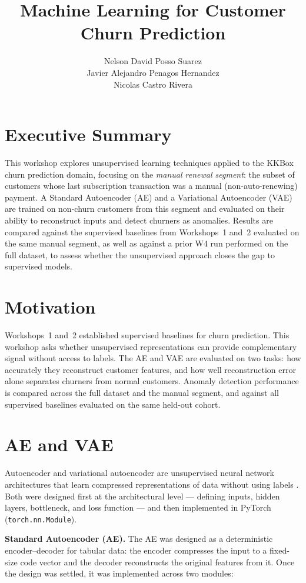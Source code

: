 \documentclass{article}
\title{ Machine Learning for Customer Churn Prediction}
\author{Nelson David Posso Suarez \\ Javier Alejandro Penagos Hernandez \\ Nicolas Castro Rivera }
\date{}
\begin{document}
\maketitle


\section{Executive Summary}
This workshop explores unsupervised learning techniques applied to the KKBox churn
prediction domain, focusing on the \textit{manual renewal segment}: the subset of
customers whose last subscription transaction was a manual (non-auto-renewing) payment.
A Standard Autoencoder (AE) and a Variational Autoencoder (VAE) are trained on
non-churn customers from this segment and evaluated on their ability to reconstruct
inputs and detect churners as anomalies. Results are compared against the supervised
baselines from Workshops~1 and~2 evaluated on the same manual segment, as well as
against a prior W4 run performed on the full dataset, to assess whether the
unsupervised approach closes the gap to supervised models.

\section{Motivation}
Workshops~1 and~2 established supervised baselines for churn prediction. This workshop
asks whether unsupervised representations can provide complementary signal without
access to labels. The AE and VAE are evaluated on two tasks: how accurately they
reconstruct customer features, and how well reconstruction error alone separates
churners from normal customers. Anomaly detection performance is compared across
the full dataset and the manual segment, and against all supervised baselines
evaluated on the same held-out cohort.



\section{AE and VAE}
Autoencoder and variational autoencoder are unsupervised neural network architectures
that learn compressed representations of data without using labels \cite{goodfellow2016deep}.
Both were designed first at the architectural level --- defining inputs, hidden layers,
bottleneck, and loss function --- and then implemented in PyTorch (\texttt{torch.nn.Module}).

\textbf{Standard Autoencoder (AE).} The AE was designed as a deterministic
encoder--decoder for tabular data: the encoder compresses the input to a fixed-size
code vector and the decoder reconstructs the original features from it. Once the
design was settled, it was implemented across two modules:
\end{document}
